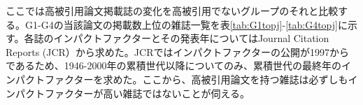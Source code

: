ここでは高被引用論文掲載誌の変化を高被引用でないグループのそれと比較する。G1-G4の当該論文の掲載数上位の雑誌一覧を表\ref{tab:G1topj}-\ref{tab:G4topj}に示す。各誌のインパクトファクターとその発表年についてはJournal Citation Reports  (JCR）\cite{JCR1}から求めた。JCRではインパクトファクターの公開が1997からであるため、1946-2000年の累積世代以降についてのみ、累積世代の最終年のインパクトファクターを求めた。ここから、高被引用論文を持つ雑誌は必ずしもインパクトファクターが高い雑誌ではないことが伺える。
